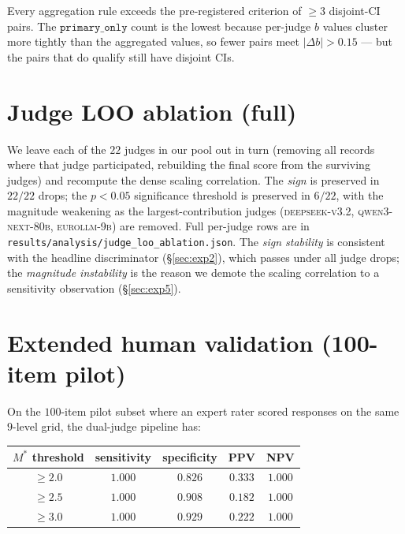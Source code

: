 \documentclass{article}
\newcommand{\sdi}{\ensuremath{b}}
\begin{document}
Every aggregation rule exceeds the pre-registered criterion of
$\geq 3$ disjoint-CI pairs. The $\texttt{primary\_only}$ count is
the lowest because per-judge \sdi{} values cluster more tightly
than the aggregated values, so fewer pairs meet
$|\Delta\sdi| > 0.15$ --- but the pairs that do qualify still have
disjoint CIs.

\section{Judge LOO ablation (full)}\label{app:judge_loo}

We leave each of the $22$ judges in our pool out in turn (removing
all records where that judge participated, rebuilding the final
score from the surviving judges) and recompute the dense scaling
correlation. The \emph{sign} is preserved in $22/22$ drops; the
$p < 0.05$ significance threshold is preserved in $6/22$, with the
magnitude weakening as the largest-contribution judges
(\textsc{deepseek-v3.2}, \textsc{qwen3-next-80b},
\textsc{eurollm-9b}) are removed. Full per-judge rows are in
\texttt{results/analysis/judge\_loo\_ablation.json}. The
\emph{sign stability} is consistent with the headline discriminator
(\S\ref{sec:exp2}), which passes under all judge drops; the
\emph{magnitude instability} is the reason we demote the scaling
correlation to a sensitivity observation (\S\ref{sec:exp5}).

\section{Extended human validation (100-item pilot)}\label{app:human_val}

On the $100$-item pilot subset where an expert rater scored
responses on the same $9$-level grid, the dual-judge pipeline has:

\begin{center}
\small
\begin{tabular}{c c c c c}
\toprule
$M^*$ threshold & sensitivity & specificity & PPV & NPV \\
\midrule
$\geq 2.0$ & $1.000$ & $0.826$ & $0.333$ & $1.000$ \\
$\geq 2.5$ & $1.000$ & $0.908$ & $0.182$ & $1.000$ \\
$\geq 3.0$ & $1.000$ & $0.929$ & $0.222$ & $1.000$ \\
\bottomrule
\end{tabular}
\end{center}
\end{document}
